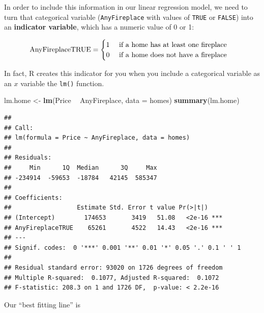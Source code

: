 \documentclass[]{book}
\newenvironment{Shaded}{\begin{snugshade}}{\end{snugshade}}
\newcommand{\DataTypeTok}[1]{\textcolor[rgb]{0.13,0.29,0.53}{#1}}
\newcommand{\DecValTok}[1]{\textcolor[rgb]{0.00,0.00,0.81}{#1}}
\newcommand{\KeywordTok}[1]{\textcolor[rgb]{0.13,0.29,0.53}{\textbf{#1}}}
\newcommand{\NormalTok}[1]{#1}
\newcommand{\OperatorTok}[1]{\textcolor[rgb]{0.81,0.36,0.00}{\textbf{#1}}}
\newcommand{\StringTok}[1]{\textcolor[rgb]{0.31,0.60,0.02}{#1}}
\begin{document}
\begin{Shaded}
\end{Shaded}

In order to include this information in our linear regression model, we need to turn that categorical variable (\texttt{AnyFireplace} with values of \texttt{TRUE} or \texttt{FALSE}) into an \textbf{indicator variable}, which has a numeric value of 0 or 1:

\[ \hbox{AnyFireplaceTRUE} = \begin{cases}1 \quad \text{ if a home has at least one fireplace}\\ 0\quad \text{ if a home does not have a fireplace} \end{cases}\]

In fact, R creates this indicator for you when you include a categorical variable as an \(x\) variable the \texttt{lm()} function.

\begin{Shaded}
\begin{Highlighting}[]
\NormalTok{lm.home <-}\StringTok{ }\KeywordTok{lm}\NormalTok{(Price }\OperatorTok{~}\StringTok{ }\NormalTok{AnyFireplace, }\DataTypeTok{data =}\NormalTok{ homes)}
\KeywordTok{summary}\NormalTok{(lm.home)}
\end{Highlighting}
\end{Shaded}

\begin{verbatim}
## 
## Call:
## lm(formula = Price ~ AnyFireplace, data = homes)
## 
## Residuals:
##     Min      1Q  Median      3Q     Max 
## -234914  -59653  -18784   42145  585347 
## 
## Coefficients:
##                  Estimate Std. Error t value Pr(>|t|)    
## (Intercept)        174653       3419   51.08   <2e-16 ***
## AnyFireplaceTRUE    65261       4522   14.43   <2e-16 ***
## ---
## Signif. codes:  0 '***' 0.001 '**' 0.01 '*' 0.05 '.' 0.1 ' ' 1
## 
## Residual standard error: 93020 on 1726 degrees of freedom
## Multiple R-squared:  0.1077, Adjusted R-squared:  0.1072 
## F-statistic: 208.3 on 1 and 1726 DF,  p-value: < 2.2e-16
\end{verbatim}

Our ``best fitting line'' is
\end{document}
